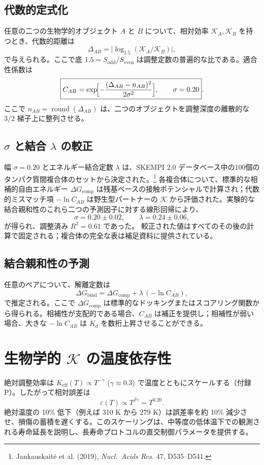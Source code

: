 \documentclass[12pt,a4paper]{ltjsarticle}
\newcommand{\REL}{\mathcal{K}}          %
\newcommand{\ABS}{K_{\mathrm{eff}}}     %
\begin{document}
	\subsection{代数的定式化}
	任意の二つの生物学的オブジェクト \(A\) と \(B\) について、相対効率 \(\REL_A,\REL_B\) を持つとき、代数的距離は
	\[
	\Delta_{AB} = \bigl|\log_{1.5}(\REL_A/\REL_B)\bigr|,
	\]
	で与えられる。ここで底 \(1.5 = S_{\mathrm{odd}}/S_{\mathrm{even}}\) は調整定数の普遍的な比である。適合性係数は
	\begin{equation}
		\boxed{C_{AB} = \exp\!\Bigl[-\frac{(\Delta_{AB}-n_{AB})^2}{2\sigma^2}\Bigr],\qquad \sigma = 0.20}.
		\label{eq:Cab}
	\end{equation}
	ここで \(n_{AB} = \operatorname{round}(\Delta_{AB})\) は、二つのオブジェクトを調整深度の離散的な \(3/2\) 梯子上に整列させる。
	
	\subsection{\(\sigma\) と結合 \(\lambda\) の較正}
	幅 \(\sigma = 0.20\) とエネルギー結合定数 \(\lambda\) は、SKEMPI 2.0 データベース中の100個のタンパク質間複合体のセットから決定された。\footnote{Jankauskaitė et al. (2019), \emph{Nucl.\ Acids Res.} 47, D535–D541.} 各複合体について、標準的な相補的自由エネルギー \(\Delta G_{\mathrm{comp}}\) は残基ベースの接触ポテンシャルで計算され；代数的ミスマッチ項 \(-\ln C_{AB}\) は野生型パートナーの \(\REL\) から評価された。実験的な結合親和性のこれら二つの予測因子に対する線形回帰により、
	\[
	\sigma = 0.20 \pm 0.02,\qquad \lambda = 0.24 \pm 0.06,
	\]
	が得られ、調整済み \(R^2 = 0.61\) であった。
	較正された値はすべてのその後の計算で固定される；複合体の完全な表は補足資料に提供されている。
	
	\subsection{結合親和性の予測}
	任意のペアについて、解離定数は
	\[
	\Delta G_{\mathrm{bind}} = \Delta G_{\mathrm{comp}} + \lambda\,(-\ln C_{AB}),
	\label{eq:Kd}
	\]
	で推定される。ここで \(\Delta G_{\mathrm{comp}}\) は標準的なドッキングまたはスコアリング関数から得られる。相補性が支配的である場合、\(C_{AB}\) は補正を提供し；相補性が弱い場合、大きな \(-\ln C_{AB}\) は \(K_d\) を数桁上昇させることができる。
	
	\section{生物学的 \(\REL\) の温度依存性}
	\label{sec:temperature}
	絶対調整効率は \(\ABS(T) \propto T^{-\gamma}\) (\(\gamma \approx 0.3\)) で温度とともにスケールする（付録 P）。したがって相対誤差は
	\[
	\varepsilon(T) \propto T^{\beta\gamma} = T^{0.20}.
	\]
	絶対温度の 10\% 低下（例えば 310 K から 279 K）は誤差率を約 10\% 減少させ、損傷の蓄積を遅くする。このスケーリングは、中等度の低体温下での観測される寿命延長を説明し、長寿命プロトコルの直交制御パラメータを提供する。
	
\end{document}
